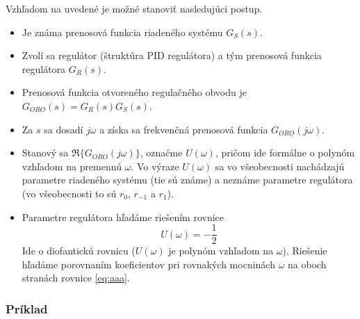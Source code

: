 \documentclass[a4paper, 10pt, ]{article}
\begin{document}
Vzhľadom na uvedené je možné stanoviť nasledujúci postup.
\begin{itemize}[leftmargin=0pt, labelsep=3mm, itemsep=0pt]
    \item Je známa prenosová funkcia riadeného systému $G_S(s)$.
    \item Zvolí sa regulátor (štruktúra PID regulátora) a tým prenosová funkcia regulátora $G_R(s)$.
    \item Prenosová funkcia otvoreného regulačného obvodu je $G_{ORO}(s) = G_R(s) G_S(s)$.
    \item Za $s$ sa dosadí $j\omega$ a získa sa frekvenčná prenosová funkcia $G_{ORO}(j\omega)$.
    \item Stanový sa $\Re \bigl\{ G_{ORO}(j\omega) \bigl\}$, označme $U(\omega)$, pričom ide formálne o polynóm vzhľadom na premennú $\omega$. Vo výraze $U(\omega)$ sa vo všeobecnosti nachádzajú parametre riadeného systému (tie sú známe) a neznáme parametre regulátora (vo všeobecnosti to sú $r_0$, $r_{-1}$ a $r_1$).
    \item Parametre regulátora hľadáme riešením rovnice
    \begin{equation} \label{eq:aaa}
        U(\omega) = -\frac{1}{2}
    \end{equation}
    Ide o diofantickú rovnicu ($U(\omega)$ je polynóm vzhľadom na $\omega$). Riešenie hľadáme porovnaním koeficientov pri rovnakých mocninách $\omega$ na oboch stranách rovnice \eqref{eq:aaa}.
\end{itemize}





\subsubsection{Príklad}
\end{document}
